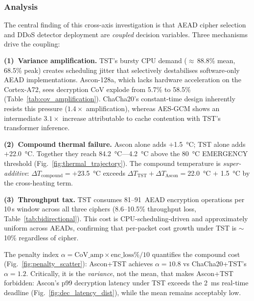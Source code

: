 \subsubsection*{Analysis}

The central finding of this cross-axis investigation is that AEAD
cipher selection and DDoS detector deployment are \emph{coupled}
decision variables.  Three mechanisms drive the coupling:

\textbf{(1)~Variance amplification.}  TST's bursty CPU demand
($\approx$\,88.8\% mean, 68.5\% peak) creates scheduling jitter
that selectively destabilises software-only AEAD implementations.
Ascon-128a, which lacks hardware acceleration on the Cortex-A72,
sees decryption CoV explode from 5.7\% to 58.5\%
(Table~\ref{tab:cov_amplification}).  ChaCha20's constant-time
design inherently resists this pressure ($1.4\times$ amplification),
whereas AES-GCM shows an intermediate $3.1\times$ increase
attributable to cache contention with TST's transformer inference.

\textbf{(2)~Compound thermal failure.}  Ascon alone adds
$+$\SI{1.5}{\degreeCelsius}; TST alone adds
$+$\SI{22.0}{\degreeCelsius}.  Together they reach
\SI{84.2}{\degreeCelsius}---\SI{4.2}{\degreeCelsius} above the
\SI{80}{\degreeCelsius} EMERGENCY threshold
(Fig.~\ref{fig:thermal_trajectory}).  The compound temperature is
\emph{super-additive}: $\Delta T_{\text{compound}}=+$\SI{23.5}{\degreeCelsius}
exceeds $\Delta T_{\text{TST}} + \Delta T_{\text{Ascon}} =%
$\SI{22.0}{\degreeCelsius} $+$ \SI{1.5}{\degreeCelsius} by
the cross-heating term.

\textbf{(3)~Throughput tax.}  TST consumes 81--91~AEAD encryption
operations per 10\,s window across all three ciphers (8.6--10.5\%
throughput loss, Table~\ref{tab:bidirectional}).  This cost is
CPU-scheduling-driven and approximately uniform across AEADs,
confirming that per-packet cost growth under TST is $\sim$10\%
regardless of cipher.

The penalty index $\alpha = \text{CoV\_amp}\times\text{enc\_loss\%}/10$
quantifies the compound cost
(Fig.~\ref{fig:penalty_scatter}): Ascon+TST achieves
$\alpha = 10.8$ vs ChaCha20+TST's $\alpha = 1.2$.  Critically,
it is the \emph{variance}, not the mean, that makes Ascon+TST
forbidden: Ascon's p99 decryption latency under TST exceeds the
\SI{2}{ms} real-time deadline
(Fig.~\ref{fig:dec_latency_dist}), while the mean remains
acceptably low.

